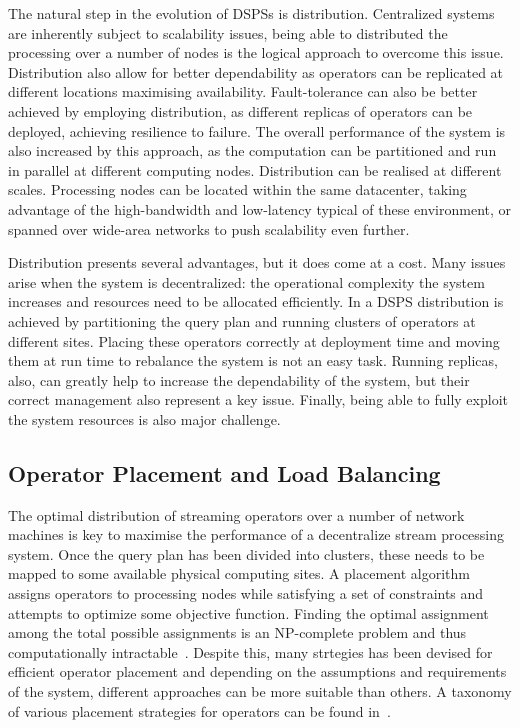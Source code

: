 The natural step in the evolution of DSPSs is distribution. Centralized systems are inherently subject to scalability
issues, being able to distributed the processing over a number of nodes is the logical approach to overcome this issue.
Distribution also allow for better dependability as operators can be replicated at different locations maximising
availability. Fault-tolerance can also be better achieved by employing distribution, as different replicas of operators
can be deployed, achieving resilience to failure. The overall performance of the system is also increased by this
approach, as the computation can be partitioned and run in parallel at different computing nodes. Distribution can be
realised at different scales. Processing nodes can be located within the same datacenter, taking advantage of the 
high-bandwidth and low-latency typical of these environment, or spanned over wide-area networks to push scalability even
further.

Distribution presents several advantages, but it does come at a cost. Many issues arise when the system is decentralized: 
the operational complexity the system increases and resources need to be allocated efficiently. In a DSPS distribution is 
achieved by partitioning the query plan and running clusters of operators at different sites. Placing these operators
correctly at deployment time and moving them at run time to rebalance the system is not an easy task. Running replicas,
also, can greatly help to increase the dependability of the system, but their correct management also represent a key
issue. Finally, being able to fully exploit the system resources is also major challenge. 

\subsection{Operator Placement and Load Balancing}

The optimal distribution of streaming operators over a number of network machines is key to maximise the performance of a
decentralize stream processing system. Once the query plan has been divided into clusters, these needs to be mapped to
some available physical computing sites. A placement algorithm assigns operators to processing nodes while satisfying a
set of constraints and attempts to optimize some objective function. Finding the optimal assignment among the total
possible assignments is an NP-complete problem and thus computationally intractable~\cite{npc-placement}. Despite this,
many strtegies has been devised for efficient operator placement and depending on the assumptions and requirements of the
system, different approaches can be more suitable than others. A taxonomy of various placement strategies for operators
can be found in~\cite{placement_strategies}.

